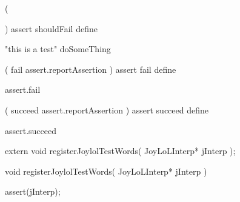 (
  
)
assert
shouldFail
define
\stopJoylolCode

\startJoylolTest
"this is a test"
doSomeThing
\stopJoylolTest
\stopTestCase
\stopTestSuite
\stoptyping

\startTestSuite[assertFail]

\startJoylolCode
(
  fail
  assert.reportAssertion
)
assert
fail
define
\stopJoylolCode

\startJoylolTest
  assert.fail
\stopJoylolTest
\stopTestCase
\stopTestSuite

\startTestSuite[assertSucceed]

\startJoylolCode
(
  succeed
  assert.reportAssertion
)
assert
succeed
define
\stopJoylolCode

\startJoylolTest
  assert.succeed
\stopJoylolTest
\stopTestCase
\stopTestSuite

\startTestSuite[assertTrue]

\stopTestSuite

\startTestSuite[assertFalse]

\stopTestSuite

\startTestSuite[assertNil]

\stopTestSuite

\startTestSuite[assertNotNil]

\stopTestSuite

\startTestSuite[assertAtom]

\stopTestSuite

\startTestSuite[assertPair]

\stopTestSuite

\startTestSuite[assertNatural]

\stopTestSuite

\startTestSuite[assertSymbol]

\stopTestSuite

\startTestSuite[assertContext]

\stopTestSuite

\startTestSuite[assertDictionary]

\stopTestSuite

\startTestSuite[assertDictNode]

\stopTestSuite


\startCHeader
extern void registerJoylolTestWords(
  JoyLoLInterp* jInterp
);
\stopCHeader
{}

\startCCode
void registerJoylolTestWords(
  JoyLoLInterp* jInterp
) {
  assert(jInterp);

}
\stopCCode